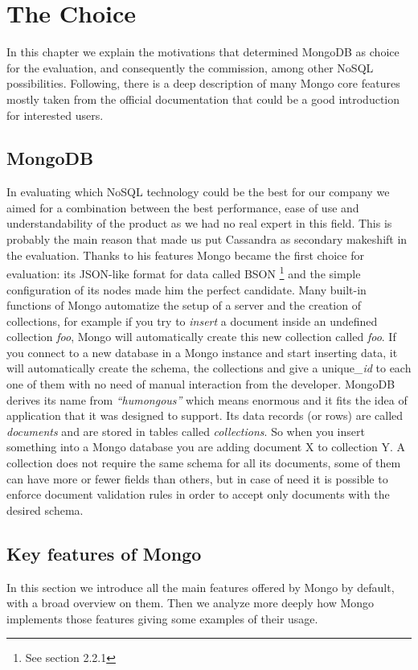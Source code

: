 \chapter{The Choice}
\label{cha:2}
In this chapter we explain the motivations that determined  MongoDB as choice for the evaluation, and consequently the commission, among other NoSQL possibilities.
Following, there is a deep description of many Mongo core features mostly taken from the official documentation that could be a good introduction for interested users.

\section{MongoDB}
\label{sec:1}
In evaluating which NoSQL technology could be the best for our company we aimed for a combination between the best performance,  ease of use and understandability of the product as we had no real expert in this field.
This is probably the main reason that made us put Cassandra as secondary makeshift in the evaluation.
Thanks to his features Mongo became the first choice for evaluation: its JSON-like format for data called BSON \footnote{See section 2.2.1} and the simple configuration of its nodes made him the perfect candidate.
Many built-in functions of Mongo automatize the setup of a server and the creation of collections, for example if you try to \textit{insert} a document inside an undefined collection \textit{foo}, Mongo will automatically create this new collection called \textit{foo}.
If you connect to a new database in a Mongo instance and start inserting data, it will automatically create the schema, the collections and give a unique\textit{\_id} to each one of them  with no need of manual interaction from the developer.
MongoDB derives its name from \textit{“humongous”} which means enormous and it fits the idea of application that it was designed to support.
Its data records (or rows) are called \textit{documents} and are stored in tables called \textit{collections}. So when you insert something into a Mongo database you are adding document X to collection Y.
A collection does not require the same schema for all its documents, some of them can have more or fewer fields than others, but in case of need it is possible to enforce document validation rules in order to accept only documents with the desired schema.

\section{Key features of Mongo}
\label{sec:2}
In this section we introduce all the main features offered by Mongo by default, with a broad overview on them. 
Then we analyze more deeply how Mongo implements those features giving some examples of their usage.

